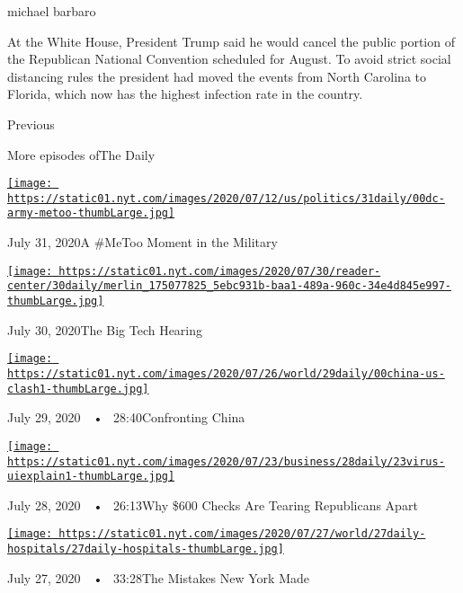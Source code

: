 michael barbaro

At the White House, President Trump said he would cancel the public
portion of the Republican National Convention scheduled for August. To
avoid strict social distancing rules the president had moved the events
from North Carolina to Florida, which now has the highest infection rate
in the country.

Previous

More episodes ofThe Daily

\href{https://www.nytimes.com/2020/07/31/podcasts/the-daily/vanessa-guillen-military-metoo.html?action=click\&module=audio-series-bar\&region=header\&pgtype=Article}{\texttt{[image: https://static01.nyt.com/images/2020/07/12/us/politics/31daily/00dc-army-metoo-thumbLarge.jpg]}}

July 31, 2020A \#MeToo Moment in the Military

\href{https://www.nytimes.com/2020/07/30/podcasts/the-daily/congress-facebook-amazon-google-apple.html?action=click\&module=audio-series-bar\&region=header\&pgtype=Article}{\texttt{[image: https://static01.nyt.com/images/2020/07/30/reader-center/30daily/merlin\_175077825\_5ebc931b-baa1-489a-960c-34e4d845e997-thumbLarge.jpg]}}

July 30, 2020The Big Tech Hearing

\href{https://www.nytimes.com/2020/07/29/podcasts/the-daily/china-trump-foreign-policy.html?action=click\&module=audio-series-bar\&region=header\&pgtype=Article}{\texttt{[image: https://static01.nyt.com/images/2020/07/26/world/29daily/00china-us-clash1-thumbLarge.jpg]}}

July 29, 2020~~•~ 28:40Confronting China

\href{https://www.nytimes.com/2020/07/28/podcasts/the-daily/unemployment-benefits-coronavirus.html?action=click\&module=audio-series-bar\&region=header\&pgtype=Article}{\texttt{[image: https://static01.nyt.com/images/2020/07/23/business/28daily/23virus-uiexplain1-thumbLarge.jpg]}}

July 28, 2020~~•~ 26:13Why \$600 Checks Are Tearing Republicans Apart

\href{https://www.nytimes.com/2020/07/27/podcasts/the-daily/new-york-hospitals-covid.html?action=click\&module=audio-series-bar\&region=header\&pgtype=Article}{\texttt{[image: https://static01.nyt.com/images/2020/07/27/world/27daily-hospitals/27daily-hospitals-thumbLarge.jpg]}}

July 27, 2020~~•~ 33:28The Mistakes New York Made


